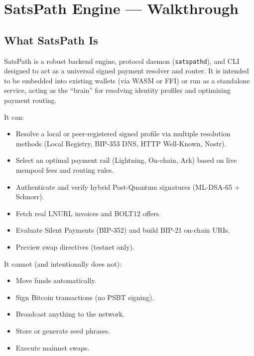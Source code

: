 \documentclass[
]{article}
\author{}
\date{}
\providecommand{\tightlist}{%
  \setlength{\itemsep}{0pt}\setlength{\parskip}{0pt}}
\begin{document}
\hypertarget{satspath-engine-walkthrough}{%
\section{SatsPath Engine ---
Walkthrough}\label{satspath-engine-walkthrough}}

\hypertarget{what-satspath-is}{%
\subsection{What SatsPath Is}\label{what-satspath-is}}

SatsPath is a robust backend engine, protocol daemon
(\texttt{satspathd}), and CLI designed to act as a universal signed
payment resolver and router. It is intended to be embedded into existing
wallets (via WASM or FFI) or run as a standalone service, acting as the
``brain'' for resolving identity profiles and optimizing payment
routing.

It can:

\begin{itemize}
\tightlist
\item
  Resolve a local or peer-registered signed profile via multiple
  resolution methods (Local Registry, BIP-353 DNS, HTTP Well-Known,
  Nostr).
\item
  Select an optimal payment rail (Lightning, On-chain, Ark) based on
  live mempool fees and routing rules.
\item
  Authenticate and verify hybrid Post-Quantum signatures (ML-DSA-65 +
  Schnorr).
\item
  Fetch real LNURL invoices and BOLT12 offers.
\item
  Evaluate Silent Payments (BIP-352) and build BIP-21 on-chain URIs.
\item
  Preview swap directives (testnet only).
\end{itemize}

It cannot (and intentionally does not):

\begin{itemize}
\tightlist
\item
  Move funds automatically.
\item
  Sign Bitcoin transactions (no PSBT signing).
\item
  Broadcast anything to the network.
\item
  Store or generate seed phrases.
\item
  Execute mainnet swaps.
\end{itemize}
\end{document}
